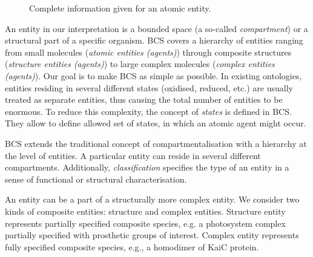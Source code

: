 \documentclass[12pt]{fithesis2}
\begin{document}
\begin{figure}[!h]
\begin{center}
\end{center}
\caption{Complete information given for an atomic entity.}
\end{figure}

An entity in our interpretation is a bounded space (a so-called \emph{compartment}) or a structural part of a specific organism. BCS covers a hierarchy of entities ranging from small molecules (\emph{atomic entities (agents)}) through composite structures (\emph{structure entities (agents)}) to large complex molecules (\emph{complex entities (agents)}). Our goal is to make BCS as simple as possible. In existing ontologies, entities residing in several different states (oxidised, reduced, etc.) are usually treated as separate entities, thus causing the total number of entities to be enormous. To reduce this complexity, the concept of \emph{states} is defined in BCS. They allow to define allowed set of states, in which an atomic agent might occur.

BCS extends the traditional concept of compartmentalisation with a hierarchy at the level of entities. A particular entity can reside in several different compartments. Additionally, \emph{classification} specifies the type of an entity in a sense of functional or structural characterisation.

An entity can be a part of a structurally more complex entity. We consider two kinds of composite entities: structure and complex entities. Structure entity represents partially specified composite species, e.g. a photosystem complex partially specified with prosthetic groups of interest. Complex entity represents fully specified composite species, e.g., a homodimer of KaiC protein.
\end{document}
